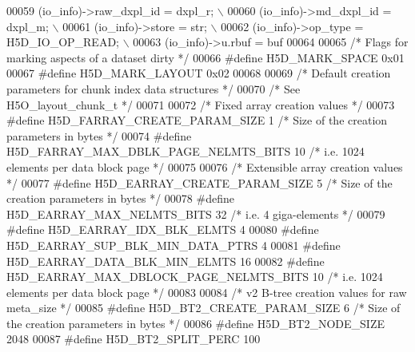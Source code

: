 \begin{DoxyCode}
00059 \textcolor{preprocessor}{    (io\_info)->raw\_dxpl\_id = dxpl\_r;                                    \(\backslash\)}
00060 \textcolor{preprocessor}{    (io\_info)->md\_dxpl\_id = dxpl\_m;                                     \(\backslash\)}
00061 \textcolor{preprocessor}{    (io\_info)->store = str;                                             \(\backslash\)}
00062 \textcolor{preprocessor}{    (io\_info)->op\_type = H5D\_IO\_OP\_READ;                                \(\backslash\)}
00063 \textcolor{preprocessor}{    (io\_info)->u.rbuf = buf}
00064 
00065 \textcolor{comment}{/* Flags for marking aspects of a dataset dirty */}
00066 \textcolor{preprocessor}{#define H5D\_MARK\_SPACE  0x01}
00067 \textcolor{preprocessor}{#define H5D\_MARK\_LAYOUT  0x02}
00068 
00069 \textcolor{comment}{/* Default creation parameters for chunk index data structures */}
00070 \textcolor{comment}{/* See H5O\_layout\_chunk\_t */}
00071 
00072 \textcolor{comment}{/* Fixed array creation values */}
00073 \textcolor{preprocessor}{#define H5D\_FARRAY\_CREATE\_PARAM\_SIZE        1   }\textcolor{comment}{/* Size of the creation parameters in bytes */}\textcolor{preprocessor}{}
00074 \textcolor{preprocessor}{#define H5D\_FARRAY\_MAX\_DBLK\_PAGE\_NELMTS\_BITS    10      }\textcolor{comment}{/* i.e. 1024 elements per data block page */}\textcolor{preprocessor}{}
00075 
00076 \textcolor{comment}{/* Extensible array creation values */}
00077 \textcolor{preprocessor}{#define H5D\_EARRAY\_CREATE\_PARAM\_SIZE        5   }\textcolor{comment}{/* Size of the creation parameters in bytes */}\textcolor{preprocessor}{}
00078 \textcolor{preprocessor}{#define H5D\_EARRAY\_MAX\_NELMTS\_BITS          32  }\textcolor{comment}{/* i.e. 4 giga-elements */}\textcolor{preprocessor}{}
00079 \textcolor{preprocessor}{#define H5D\_EARRAY\_IDX\_BLK\_ELMTS            4}
00080 \textcolor{preprocessor}{#define H5D\_EARRAY\_SUP\_BLK\_MIN\_DATA\_PTRS    4}
00081 \textcolor{preprocessor}{#define H5D\_EARRAY\_DATA\_BLK\_MIN\_ELMTS       16}
00082 \textcolor{preprocessor}{#define H5D\_EARRAY\_MAX\_DBLOCK\_PAGE\_NELMTS\_BITS  10  }\textcolor{comment}{/* i.e. 1024 elements per data block page */}\textcolor{preprocessor}{}
00083 
00084 \textcolor{comment}{/* v2 B-tree creation values for raw meta\_size */}
00085 \textcolor{preprocessor}{#define H5D\_BT2\_CREATE\_PARAM\_SIZE   6       }\textcolor{comment}{/* Size of the creation parameters in bytes */}\textcolor{preprocessor}{}
00086 \textcolor{preprocessor}{#define H5D\_BT2\_NODE\_SIZE           2048}
00087 \textcolor{preprocessor}{#define H5D\_BT2\_SPLIT\_PERC          100}

\end{DoxyCode}
